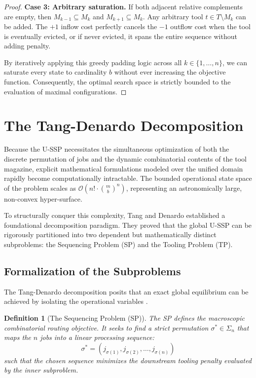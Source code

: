 \documentclass[11pt, a4paper]{book}
\newtheorem{definition}[theorem]{Definition}
\begin{document}
\begin{proof}
		\textbf{Case 3: Arbitrary saturation.}
		If both adjacent relative complements are empty, then $M_{k-1} \subseteq M_k$ and $M_{k+1} \subseteq M_k$. Any arbitrary tool $t \in T \setminus M_k$ can be added. The $+1$ inflow cost perfectly cancels the $-1$ outflow cost when the tool is eventually evicted, or if never evicted, it spans the entire sequence without adding penalty.
		
		By iteratively applying this greedy padding logic across all $k \in \{1, \dots, n\}$, we can saturate every state to cardinality $b$ without ever increasing the objective function. Consequently, the optimal search space is strictly bounded to the evaluation of maximal configurations.
	\end{proof}
	
	\section{The Tang-Denardo Decomposition}
	
	Because the U-SSP necessitates the simultaneous optimization of both the discrete permutation of jobs and the dynamic combinatorial contents of the tool magazine, explicit mathematical formulations modeled over the unified domain rapidly become computationally intractable. The bounded operational state space of the problem scales as $\mathcal{O}\left(n! \cdot \binom{m}{b}^n\right)$, representing an astronomically large, non-convex hyper-surface.
	
	To structurally conquer this complexity, Tang and Denardo \cite{Tang1988} established a foundational decomposition paradigm. They proved that the global U-SSP can be rigorously partitioned into two dependent but mathematically distinct subproblems: the Sequencing Problem (SP) and the Tooling Problem (TP).
	
	\subsection{Formalization of the Subproblems}
	
	The Tang-Denardo decomposition posits that an exact global equilibrium can be achieved by isolating the operational variables \cite{Tang1988}.
	
	\begin{definition}[The Sequencing Problem (SP)]
		The SP defines the macroscopic combinatorial routing objective. It seeks to find a strict permutation $\sigma^* \in \Sigma_n$ that maps the $n$ jobs into a linear processing sequence:
		\begin{equation}
			\sigma^* = \left( j_{\sigma(1)}, j_{\sigma(2)}, \dots, j_{\sigma(n)} \right)
		\end{equation}
		such that the chosen sequence minimizes the downstream tooling penalty evaluated by the inner subproblem.
	\end{definition}
	
\end{document}
